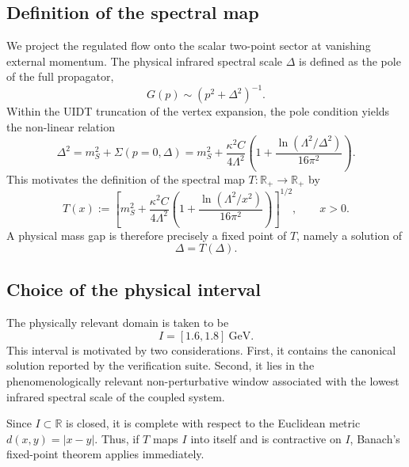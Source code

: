 \subsection{Definition of the spectral map}

We project the regulated flow onto the scalar two-point sector at vanishing external momentum. The physical infrared spectral scale \(\Delta\) is defined as the pole of the full propagator,
\begin{equation}
G(p)\sim (p^2+\Delta^2)^{-1}.
\label{eq:propagator_pole}
\end{equation}
Within the UIDT truncation of the vertex expansion, the pole condition yields the non-linear relation
\begin{equation}
\Delta^2
=
m_S^2+\Sigma(p=0,\Delta)
=
m_S^2+\frac{\kappa^2 C}{4\Lambda^2}
\left(
1+\frac{\ln(\Lambda^2/\Delta^2)}{16\pi^2}
\right).
\label{eq:gap_equation_implicit}
\end{equation}
This motivates the definition of the spectral map \(T:\mathbb{R}_+\to\mathbb{R}_+\) by
\begin{equation}
T(x)
:=
\left[
m_S^2+\frac{\kappa^2 C}{4\Lambda^2}
\left(
1+\frac{\ln(\Lambda^2/x^2)}{16\pi^2}
\right)
\right]^{1/2},
\qquad x>0.
\label{eq:spectral_map_def}
\end{equation}
A physical mass gap is therefore precisely a fixed point of \(T\), namely a solution of
\begin{equation}
\Delta=T(\Delta).
\label{eq:fixed_point_cond}
\end{equation}

\subsection{Choice of the physical interval}

The physically relevant domain is taken to be
\begin{equation}
I=[1.6,1.8]\ \mathrm{GeV}.
\label{eq:interval_def}
\end{equation}
This interval is motivated by two considerations. First, it contains the canonical solution reported by the verification suite. Second, it lies in the phenomenologically relevant non-perturbative window associated with the lowest infrared spectral scale of the coupled system.

Since \(I\subset \mathbb{R}\) is closed, it is complete with respect to the Euclidean metric \(d(x,y)=|x-y|\). Thus, if \(T\) maps \(I\) into itself and is contractive on \(I\), Banach's fixed-point theorem applies immediately.

